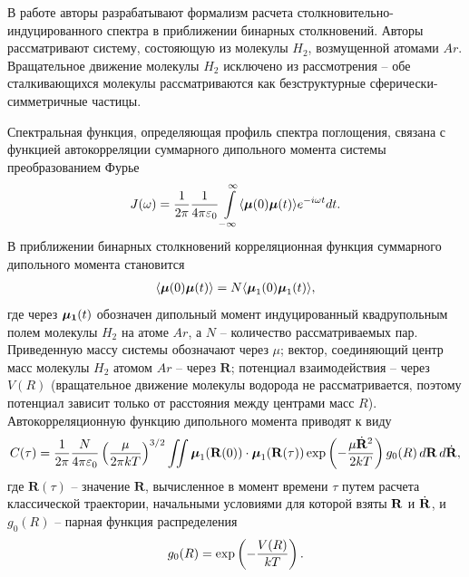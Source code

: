 В работе \cite{kranendonk1973} авторы разрабатывают формализм расчета столкновительно-индуцированного спектра в приближении бинарных столкновений. Авторы рассматривают систему, состояющую из молекулы $H_2$, возмущенной атомами $Ar$. Вращательное движение молекулы $H_2$ исключено из рассмотрения -- обе сталкивающихся молекулы рассматриваются как безструктурные сферически-симметричные частицы. \par
    Спектральная функция, определяющая профиль спектра поглощения, связана с функцией автокорреляции суммарного дипольного момента системы преобразованием Фурье
\begin{gather}
    J(\omega) = \frac{1}{2\pi} \frac{1}{4 \pi \varepsilon_0} \int\limits_{-\infty}^\infty \langle  \boldsymbol{\mu}(0) \boldsymbol{\mu}(t)  \rangle e^{-i \omega t} dt. \label{twoatom-spectral-function}
\end{gather} 
В приближении бинарных столкновений корреляционная функция суммарного дипольного момента становится 
\begin{gather}
    \langle  \boldsymbol{\mu}(0) \boldsymbol{\mu}(t)  \rangle = N \langle  \boldsymbol{\mu}_1(0) \boldsymbol{\mu}_1(t)  \rangle,
\end{gather} 
%
где через $\boldsymbol{\mu_1}(t)$ обозначен дипольный момент индуцированный квадрупольным полем молекулы $H_2$ на атоме $Ar$, а $N$ -- количество рассматриваемых пар. Приведенную массу системы обозначают через $\mu$; вектор, соединяющий центр масс молекулы $H_2$ атомом $Ar$ -- через $\mathbf{R}$; потенциал взаимодействия -- через $V(R)$ (вращательное движение молекулы водорода не рассматривается, поэтому потенциал зависит только от расстояния между центрами масс $R$). Автокорреляционную функцию дипольного момента приводят к виду 
\begin{gather}
    C(\tau) = \frac{1}{2 \pi} \frac{N}{4 \pi \varepsilon_0} \left( \frac{\mu}{2 \pi k T} \right)^{3/2} \iint \boldsymbol{\mu}_1(\mathbf{R}(0)) \cdot \boldsymbol{\mu}_1(\mathbf{R}(\tau)) \exp \left( -\frac{\mu \dot{\mathbf{R}}^2}{2 k T} \right) g_0(R) \, d \mathbf{R} \, d \dot{\mathbf{R}}, \label{kranendonk-correlation-function}
\end{gather}
%
где $\mathbf{R}(\tau)$ -- значение $\mathbf{R}$, вычисленное в момент времени $\tau$ путем расчета классической траектории, начальными условиями для которой взяты $\mathbf{R}$ и $\dot{\mathbf{R}}$, и $g_0(R)$ -- парная функция распределения 
\begin{gather}
    g_0(R) = \exp \left( -\frac{V(R)}{kT} \right).
\end{gather}


